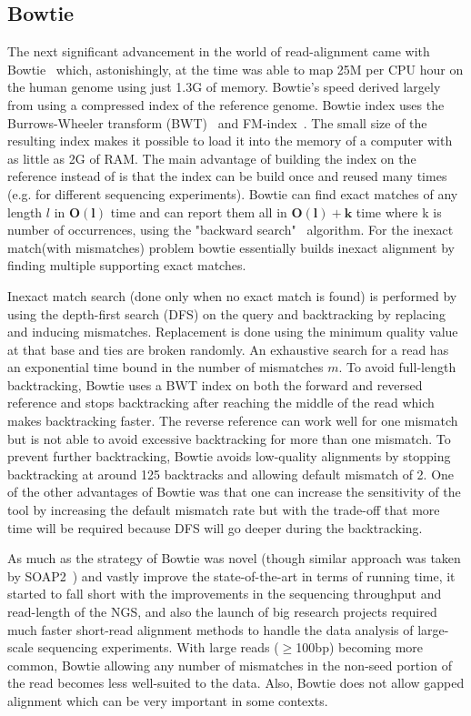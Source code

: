 \subsection{Bowtie~\citep{bowtie}} \label{bowtie}
The next significant advancement in the world of read-alignment came with Bowtie~\citep{bowtie} which, astonishingly, at the time was able to map 25M \reads per CPU hour on the human genome using just 1.3G of memory. Bowtie's speed derived largely from using a compressed index of the reference genome. Bowtie index uses the Burrows-Wheeler transform (BWT)~\citep{burrows1994block} and FM-index~\citep{ferragina2000opportunistic, ferragina2001experimental}. The small size of the resulting index makes it possible to load it into the memory of a computer with as little as 2G of RAM. The main advantage of building the index on the reference instead of \reads is that the index can be build once and reused many times (e.g. for different sequencing experiments). Bowtie can find exact matches of any length $l$ in $\bm{O(l)}$ time and can report them all in $\bm{O(l) + k}$ time where k is number of occurrences, using the "backward search"~\citep{ferragina2000opportunistic} algorithm. For the inexact match(with mismatches) problem bowtie essentially builds inexact alignment by finding multiple supporting exact matches.

Inexact match search (done only when no exact match is found) is performed by using the depth-first search (DFS) on the query and backtracking by replacing and inducing mismatches. Replacement is done using the minimum quality value at that base and ties are broken randomly. An exhaustive search for a read has an exponential time bound in the number of mismatches $m$. To avoid full-length backtracking, Bowtie uses a BWT index on both the forward and reversed reference and stops backtracking after reaching the middle of the read which makes backtracking faster. The reverse reference can work well for one mismatch but is not able to avoid excessive backtracking for more than one mismatch. To prevent further backtracking, Bowtie avoids low-quality alignments by stopping backtracking at around 125 backtracks and allowing default mismatch of 2. One of the other advantages of Bowtie was that one can increase the sensitivity of the tool by increasing the default mismatch rate but with the trade-off that more time will be required because DFS will go deeper during the backtracking. 

As much as the strategy of Bowtie was novel (though similar approach was taken by SOAP2~\citep{li2009soap2}) and vastly improve the state-of-the-art in terms of running time, it started to fall short with the improvements in the sequencing throughput and read-length of the NGS, and also the launch of big research projects required much faster short-read alignment methods to handle the data analysis of large-scale sequencing experiments. With large reads ($\geq$100bp) becoming more common, Bowtie allowing any number of mismatches in the non-seed portion of the read becomes less well-suited to the data. Also, Bowtie does not allow gapped alignment which can be very important in some contexts.


